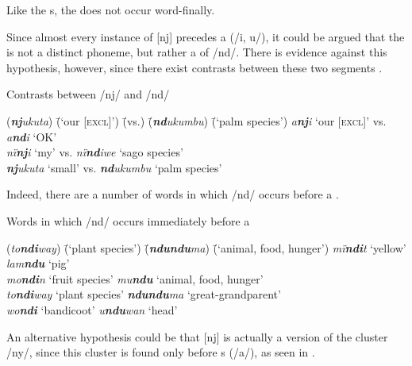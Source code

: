 Like the   s, the    does not occur word-finally.

  Since almost every instance of [nj] precedes a  (/i, u/), it could be argued that the  is not a distinct phoneme, but rather a   of /nd/. There is evidence against this hypothesis, however, since there exist contrasts between these two segments .

\ea%
    \label{ex:phon:19}
            Contrasts between /nj/ and /nd/\\
\begin{tabbing}
{(\textit{\textbf{nj}ukuta})} \= {(‘our [\textsc{excl}]’)} \= {(vs.)} \= {(\textit{\textbf{nd}ukumbu})} \= {(‘palm species’)}\kill
{\textit{a\textbf{nj}i}} \> {‘our [\textsc{excl}]’} \> {vs.} \> {\textit{a\textbf{nd}i}} \> {‘OK’}\\
{\textit{nï\textbf{nj}i}} \> {‘my’} \> {vs.} \> {\textit{nï\textbf{nd}iwe}} \> {‘sago species’}\\
{\textit{\textbf{nj}ukuta}} \> {‘small’} \> {vs.} \> {\textit{\textbf{nd}ukumbu}} \> {‘palm species’}
\end{tabbing}
\z

Indeed, there are a number of words in which /nd/ occurs before a  .

\ea%
    \label{ex:phon:20}
          Words in which /nd/ occurs immediately before a \\
\begin{tabbing}
{(\textit{to\textbf{ndi}way})} \= {(‘plant species’)} \= {(\textit{\textbf{ndundu}ma})} \= {(‘animal, food, hunger’)}\kill
{\textit{mï\textbf{ndi}t}} \> {‘yellow’} \> {\textit{lam\textbf{ndu}}} \> {‘pig’}\\
{\textit{mo\textbf{ndi}n}} \> {‘fruit species’} \> {\textit{mu\textbf{ndu}}} \> {‘animal, food, hunger’}\\
{\textit{to\textbf{ndi}way}} \> {‘plant species’} \> {\textit{\textbf{ndundu}ma}} \> {‘great-grandparent’}\\
{\textit{wo\textbf{ndi}}} \> {‘bandicoot’} \> {\textit{u\textbf{ndu}wan}} \> {‘head’}
\end{tabbing}
\z

An alternative hypothesis could be that [nj] is actually a  version of the  cluster /ny/, since this cluster is found only before s (/a/), as seen in .

